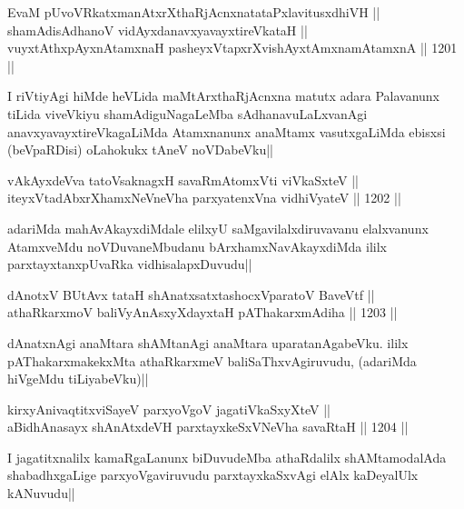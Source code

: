 \begin{shl}
EvaM pUvoVRkatxmanAtxrXthaRjAcnxnatataPxlavitusxdhiVH || \\
shamAdisAdhanoV vidAyxdanavxyavayxtireVkataH || \\
vuyxtAthxpAyxnAtamxnaH pasheyxVtapxrXvishAyx\s \s tAmxnamAtamxnA ||  1201 || 
\end{shl} 

\begin{artha}
I riVtiyAgi hiMde heVLida maMtArxthaRjAcnxna matutx adara Palavanunx tiLida viveVkiyu shamAdiguNagaLeMba sAdhanavuLaLxvanAgi anavxyavayxtireVkagaLiMda Atamxnanunx anaMtamx vasutxgaLiMda ebisxsi (beVpaRDisi) oLahokukx tAneV noVDabeVku||
\end{artha}

\begin{shl}
vAkAyxdeVva tatoV\s saknagxH savaRmAtomxVti viVkaSxteV || \\
iteyxVtadAbxrXhamxNeVneVha parxyatenxVna vidhiVyateV ||  1202 ||  
\end{shl}

\begin{artha}
adariMda mahAvAkayxdiMdale elilxyU saMgavilalxdiruvavanu elalxvanunx AtamxveMdu noVDuvaneMbudanu bArxhamxNavAkayxdiMda ililx parxtayxtanxpUvaRka vidhisalapxDuvudu||
\end{artha}

\begin{shl}
dAnotxV BUtAvx tataH shAnatxsatxtashocxVparatoV BaveVtf ||  \\
athaRkarxmoV baliVyAnAsxyXdayxtaH pAThakarxmAdiha ||  1203 ||  
\end{shl}

\begin{artha}
dAnatxnAgi anaMtara shAMtanAgi anaMtara uparatanAgabeVku. ililx pAThakarxmakekxMta athaRkarxmeV baliSaThxvAgiruvudu, (adariMda hiVgeMdu tiLiyabeVku)||
\end{artha}


\begin{shl}
kirxyAnivaqtitxviSayeV parxyoVgoV jagatiVkaSxyXteV || \\
aBidhAnasayx shAnAtxdeVH parxtayxkeSxVNeVha savaRtaH ||  1204 ||  
\end{shl}

\begin{artha}
I jagatitxnalilx kamaRgaLanunx biDuvudeMba athaRdalilx shAMtamodalAda shabadhxgaLige parxyoVgaviruvudu parxtayxkaSxvAgi elAlx kaDeyalUlx kANuvudu||
\end{artha}

